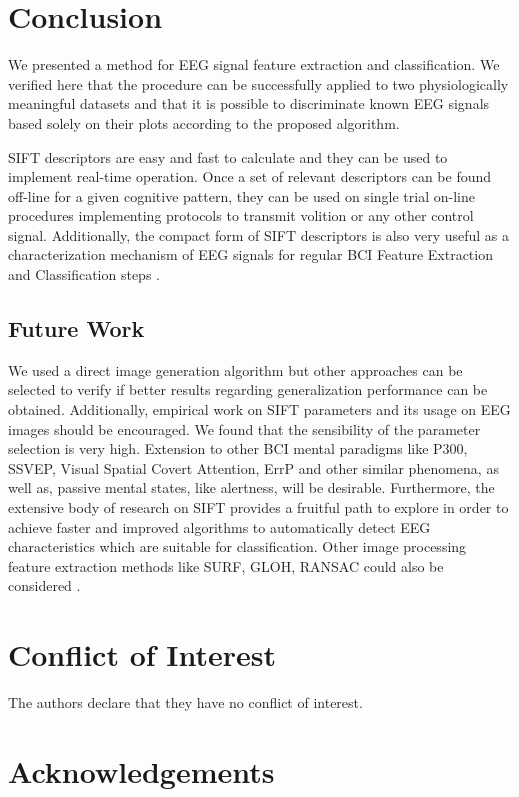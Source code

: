 \documentclass[nouppercase]{ifmbe}
\begin{document}
\section{Conclusion}

We presented a method for EEG signal feature extraction and classification.  We verified here that the procedure can be successfully applied to two physiologically meaningful datasets and that it is possible to discriminate known EEG signals based solely on their plots according to the proposed algorithm.

SIFT descriptors are easy and fast to calculate and they can be used to implement real-time operation.  Once a set of relevant descriptors can be found off-line for a given cognitive pattern, they can be used on single trial on-line procedures implementing protocols to transmit volition or any other control signal.  Additionally, the compact form of SIFT descriptors is also very useful as a characterization mechanism of EEG signals for regular BCI Feature Extraction and Classification steps \cite{c6}. 

\subsection{Future Work}

We used a direct image generation algorithm but other approaches can be selected to verify if better results regarding generalization performance can be obtained.  Additionally, empirical work on SIFT parameters and its usage on EEG images should be encouraged.  We found that the sensibility of the parameter selection is very high.  Extension to other BCI mental paradigms like P300, SSVEP, Visual Spatial Covert Attention, ErrP \cite{c6} and other similar phenomena, as well as, passive mental states, like alertness, will be desirable.  Furthermore, the extensive body of research on SIFT provides a fruitful path to explore in order to achieve faster and improved algorithms to automatically detect EEG characteristics which are suitable for classification. Other image processing feature extraction methods like SURF, GLOH, RANSAC could also be considered \cite{c9}.

\section*{Conflict of Interest}
The authors declare that they have no conflict of interest.


\section*{Acknowledgements}
\end{document}

